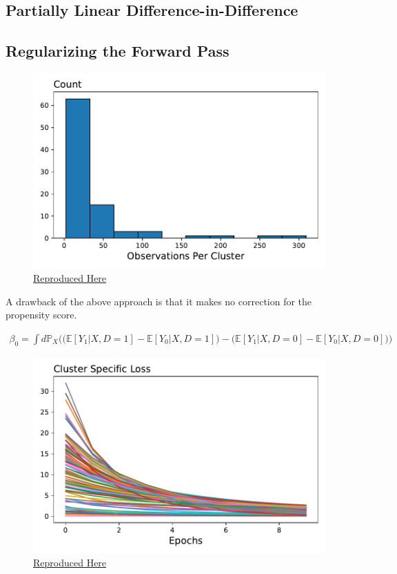 \documentclass[a4paper,12pt]{article}
\begin{document}
\subsection{Partially Linear Difference-in-Difference}

\subsection{Regularizing the Forward Pass}
\begin{figure}[htbp]
\centering
\includegraphics[width=.5\linewidth]{figures/rtc/results/cceh/cluster_dist_False_False.pdf}
\caption{ \href{https://github.com/pharringtonp19/evictions/blob/main/scripts/cceh/primary/diff_n_mean_rrh.py}{Reproduced Here}}
\label{FIGURE LABEL}
\end{figure}
A drawback of the above approach is that it makes no correction for the propensity score. 

\begin{align*}
    \beta _0 = \int d\mathbb{P}_X\Big(\big(\mathbb{E}[Y_1 |X,D=1] - \mathbb{E}[Y_0 |X,D=1]\big) -  \big(\mathbb{E}[Y_1 |X,D=0] - \mathbb{E}[Y_0 |X,D=0]\big)\Big)
\end{align*}

\begin{figure}[htbp]
\centering
\includegraphics[width=.5\linewidth]{figures/framework/inner_loop_0.pdf}
\caption{ \href{https://github.com/pharringtonp19/evictions/blob/main/scripts/cceh/primary/diff_n_mean_rrh.py}{Reproduced Here}}
\label{FIGURE LABEL}
\end{figure}
\end{document}
